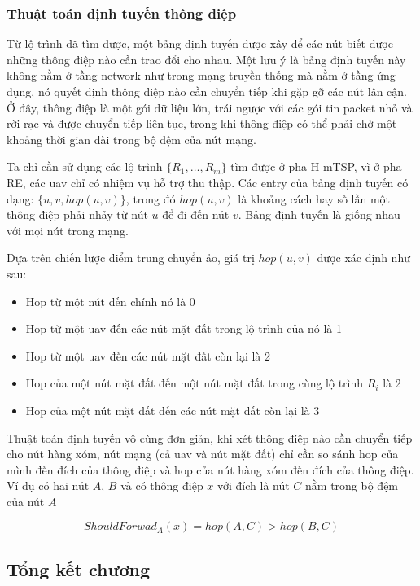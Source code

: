 \documentclass[a4paper]{article}
\begin{document}
\subsubsection{Thuật toán định tuyến thông điệp}

Từ lộ trình đã tìm được, một bảng định tuyến được xây để các nút biết được những thông điệp nào cần trao đổi cho nhau. Một lưu ý là bảng định tuyến này không nằm ở tầng network như trong mạng truyền thống mà nằm ở tầng ứng dụng, nó quyết định thông điệp nào cần chuyển tiếp khi gặp gỡ các nút lân cận. Ở đây, thông điệp là một gói dữ liệu lớn, trái ngược với các gói tin packet nhỏ và rời rạc và được chuyển tiếp liên tục, trong khi thông điệp có thể phải chờ một khoảng thời gian dài trong bộ đệm của nút mạng.

Ta chỉ cần sử dụng các lộ trình $\{R_1, \dots, R_m\}$ tìm được ở pha H-mTSP, vì ở pha RE, các uav chỉ có nhiệm vụ hỗ trợ thu thập. 
Các entry của bảng định tuyến có dạng: $\{u, v, hop(u, v)\}$, trong đó $hop(u, v)$ là khoảng cách hay số lần một thông điệp phải nhảy từ nút $u$ để đi đến nút $v$. Bảng định tuyến là giống nhau với mọi nút trong mạng.

Dựa trên chiến lược điểm trung chuyển ảo, giá trị $hop(u, v)$ được xác định như sau:
\begin{itemize}
  \item Hop từ một nút đến chính nó là 0
  \item Hop từ một uav đến các nút mặt đất trong lộ trình của nó là 1
  \item Hop từ một uav đến các nút mặt đất còn lại là 2
  \item Hop của một nút mặt đất đến một nút mặt đất trong cùng lộ trình $R_i$ là 2
  \item Hop của một nút mặt đất đến các nút mặt đất còn lại là 3
\end{itemize}

Thuật toán định tuyến vô cùng đơn giản, khi xét thông điệp nào cần chuyển tiếp cho nút hàng xóm, nút mạng (cả uav và nút mặt đất) chỉ cần so sánh hop của mình đến đích của thông điệp và hop của nút hàng xóm đến đích của thông điệp. Ví dụ có hai nút $A$, $B$ và có thông điệp $x$ với đích là nút $C$ nằm trong bộ đệm của nút $A$

\begin{equation}
  ShouldForwad_A(x) = hop(A,C) > hop(B, C)
\end{equation}

\subsection{Tổng kết chương}
\end{document}
